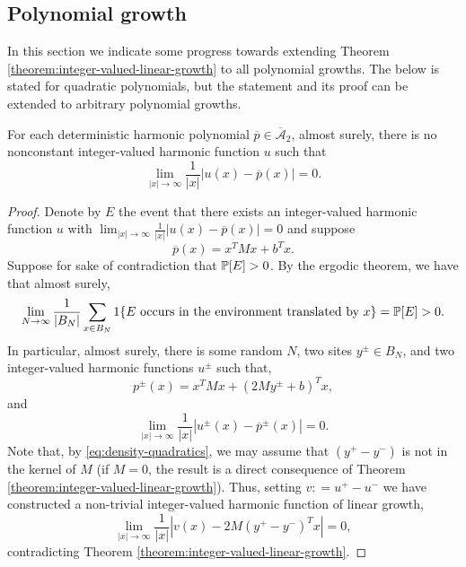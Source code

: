 \documentclass[12pt]{amsart}
\numberwithin{equation}{section}
\begin{document}
	
	
	\subsection{Polynomial growth}  \label{subsec:polynomial-growth}
	In this section we indicate some progress towards extending Theorem \ref{theorem:integer-valued-linear-growth} to all polynomial growths. The below is stated for quadratic polynomials, 
	but the statement and its proof can be extended to arbitrary polynomial growths.  
	
	
	\begin{prop} \label{prop:rational-matrix}
		For each deterministic harmonic polynomial $\overline{p} \in \overline{\mathcal{A}}_2$, almost surely, there is no nonconstant integer-valued harmonic function $u$ such that 
		\[
		\lim_{|x| \to \infty} \frac{1}{|x|}|u(x) - \overline{p}(x)| = 0.
		\]
	\end{prop}
	\begin{proof}
		Denote by $E$ the event that there exists an integer-valued harmonic function $u$ with 
		$\lim_{|x| \to \infty} \frac{1}{|x|}|u(x) - \overline{p}(x)| = 0$
		and suppose
		\[
		\overline{p}(x) = x^T  M x + b^T x.
		\]
		Suppose for sake of contradiction that $\P[E] > 0$. 
		By the ergodic theorem, we have that almost surely, 
		\begin{equation} \label{eq:density-quadratics}
			\lim_{N \to \infty} \frac{1}{|B_N|} \sum_{x \in B_N} 1\{ \mbox{$E$ occurs in the environment translated by $x$} \} = \P[E] > 0.
		\end{equation}
		In particular, almost surely, there is some random $N$, two sites $y^{\pm} \in B_N$, and two integer-valued harmonic functions $u^{\pm}$
		such that, 
		\[
		p^{\pm}(x) =  x^T M x + (2 M y^{\pm} + b)^T x,
		\] 
		and
		\[
		\lim_{|x| \to \infty} \frac{1}{|x|}|u^{\pm}(x) - \overline{p}^{\pm}(x)| = 0.
		\]
		Note that, by \eqref{eq:density-quadratics}, we may assume that $(y^{+} - y^{-})$ is not in the kernel of $M$ (if $M =0$, the result is a direct consequence of Theorem \ref{theorem:integer-valued-linear-growth}). Thus, setting $v: = u^+ - u^-$ we have 
		constructed a non-trivial integer-valued harmonic function of linear growth, 
		\[
		\lim_{|x| \to \infty} \frac{1}{|x|} |v(x) - 2 M (y^{+} - y^-)^T x | = 0,
		\]
		contradicting Theorem \ref{theorem:integer-valued-linear-growth}.  
	\end{proof}
	
	
	
	
\end{document}
